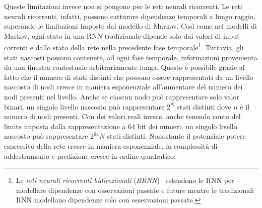Queste limitazioni invece non si pongono per le reti neurali ricorrenti.
Le reti neurali ricorrenti, infatti, possono catturare dipendenze temporali a lungo raggio, superando le limitazioni imposte dal modello di Markov.
Cos\`i come nei modelli di Markov, ogni stato in una RNN tradizionale dipende solo dai valori di input correnti e dallo stato della rete nella precedente fase temporale\footnote{Le \emph{reti neurali ricorrenti bidirezionali} (\emph{BRNN})~\cite{Schuster:1997} estendono le RNN per modellare dipendenze con osservazioni passate e future mentre le tradizionali RNN modellano dipendenze solo con osservazioni passate.}.
Tuttavia, gli stati nascosti possono contenere, ad ogni fase temporale, informazioni provenienta da una finestra contestuale arbitrariamente lunga.
Questo \`e possibile grazie al fatto che il numero di stati distinti che possono essere rappresentati da un livello nascosto di nodi cresce in maniera esponenziale all'aumentare del numero dei nodi presenti nel livello.
Anche se ciascun nodo pu\`o rappresentare solo valor binari, un singolo livello nascosto pu\`o rappresentare $2^N$ stati distinti dove $n$ \`e il numero di nodi presenti.
Con dei valori reali invece, anche tenendo conto del limite imposta dalla rappresentazione a 64 bit dei numeri, un singolo livello nascosto pu\`o rappresentare $2^64N$ stati distinti.
Nonostante il potenziale potere espressivo della rete cresce in maniera esponenziale, la complessit\`a di addestramento e predizione cresce in ordine quadratico.

